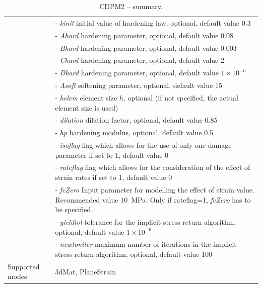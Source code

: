\documentclass[a4paper]{article}
\newcommand{\param}[1]{{\it #1}}
\newenvironment{mmt}{\begin{tabular}{|l|p{9cm}|}}{\end{tabular}\\}
\newenvironment{mmt}{\begin{tabular}{|l|l|}}{\end{tabular}\\}
\begin{document}
\begin{table}[!htb]
\begin{mmt}
&- \param{kinit} initial value of hardening law, optional, default value 0.3\\
&- \param{Ahard} hardening parameter, optional, default value 0.08\\
&- \param{Bhard} hardening parameter, optional, default value 0.003\\
&- \param{Chard} hardening parameter, optional, default value 2\\
&- \param{Dhard} hardening parameter, optional, default value $1\times 10^{-6}$\\
&- \param{Asoft} softening parameter, optional, default value 15\\
&- \param{helem} element size $h$, optional (if not specified, the actual element size is used)\\
&- \param{dilation} dilation factor, optional, default value 0.85\\
&- \param{hp} hardening modulus, optional, default value 0.5\\
&- \param{isoflag} flag which allows for the use of only one damage parameter if set to 1, default value 0\\
&- \param{rateflag} flag which allows for the consideration of the effect of strain rates if set to 1, default value 0\\
&- \param{fcZero} Input parameter for modelling the effect of strain value. Recommended value $10$~MPa. Only if rateflag=1, \param{fcZero} has to be specified.\\
&- \param{yieldtol} tolerance for the implicit stress return algorithm, optional, default value $1 \times 10^{-6}$\\
&- \param{newtoniter} maximum number of iterations in the implicit stress return algorithm, optional, default value 100\\
Supported modes& 3dMat, PlaneStrain\\
\hline
\end{mmt}
\caption{CDPM2 -- summary.}
\label{cdpm2_table}
\end{table}
\end{document}
